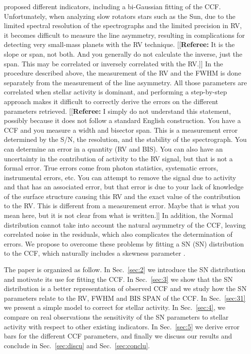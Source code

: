 \documentclass[11pt, oneside]{article}
\newcommand{\comment}[1]{{\color{red}[[\textbf{Referee: }#1]]}}
\begin{document}
\citet{Figueira-2013} proposed different indicators, including a bi-Gaussian fitting of the CCF. Unfortunately, when analyzing slow rotators stars such as the Sun, due to the limited spectral resolution of the spectrographs and the limited precision in RV, it becomes difficult to measure the line asymmetry, resulting in complications for detecting very small-mass planets with the RV technique.
\comment{It is the slope or span, not both. And you generally do not calculate the inverse, just the
span. This may be correlated or inversely correlated with the RV.}
In the procedure described above, the measurement of the RV and the FWHM is done separately from the measurement of the line asymmetry. All those parameters are correlated when stellar activity is dominant, and performing a step-by-step approach makes it difficult to correctly derive the errors on the different parameters retrieved. 
\comment{I simply do not understand this statement, possibly because it does not follow a standard English construction. You have a CCF and you measure a width and bisector span. This is a measurement error determined by the S/N, the resolution, and the stability of the spectrograph. You can determine an error in a quantity (RV and BIS). You can also have an uncertainty in the contribution of activity to the RV signal, but that is not a formal error. True errors come from photon statistics, systematic errors, instrumental errors, etc. You can attempt to remove the signal due to activity and that has an associated error, but that error is due to your lack of knowledge of the surface structure causing this RV and the exact value of the contribution to the RV. This is different from a measurement error. Maybe that is what you mean here, but it is not clear from what is written.}
In addition, the Normal distribution cannot take into account the natural asymmetry of the CCF, leaving correlated noise in the residuals, which also complicates the determination of errors. We propose to overcome these problems by fitting a SN (SN) distribution to the CCF, which naturally includes a skewness parameter \citep[][]{Azzalini1985}.

The paper is organized as follow. In Sec.~\ref{sec:2} we introduce the SN distribution and motivate its use for fitting the CCF. In Sec.~\ref{sec:3} we show that the SN distribution is a better representation of observed CCF and we study how the SN parameters relate to the RV, FWHM and BIS SPAN of the CCF. In Sec.~\ref{sec:31} we present a simple model to correct for stellar activity. In Sec.~\ref{sec:4}, we compare on real observations the sensitivity of the SN parameters to stellar activity with respect to other existing indicators. In Sec.~\ref{sec:5} we derive error bars for the different CCF parameters, and finally we discuss our results and conclude in Sec.~\ref{sec:discu} and Sec.~\ref{sec:conclu}.
\end{document}
